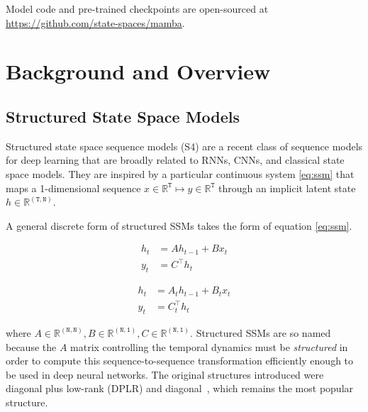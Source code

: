 Model code and pre-trained checkpoints are open-sourced at \url{https://github.com/state-spaces/mamba}.

\section{Background and Overview}
\label{sec:background}

\subsection{Structured State Space Models}

Structured state space sequence models (S4) are a recent class of sequence models for deep learning that are broadly related to RNNs, CNNs, and classical state space models. They are inspired by a particular continuous system \eqref{eq:ssm}
that maps a 1-dimensional sequence $x \in \mathbb{R}^\mathtt{T} \mapsto y \in \mathbb{R}^\mathtt{T}$ through an implicit latent state \( h \in \mathbb{R}^{\mathtt{(T, N)}} \). 

A general discrete form of structured SSMs takes the form of equation \eqref{eq:ssm}.

\begin{center}

\begin{minipage}[t]{.45\linewidth}
\begin{subequations}
  \label{eq:ssm}
  \begin{align}
  \label{eq:ssm:1}
    h_{t} &= A h_{t-1} + B x_t \\
  \label{eq:ssm:2}
    y_t &= C^{\top} h_t
  \end{align}
\end{subequations}
\end{minipage}
\qquad
\begin{minipage}[t]{.45\linewidth}
\begin{subequations}
  \label{eq:s6}
  \begin{align}
  \label{eq:s6:1}
    h_{t} &= A_t h_{t-1} + B_t x_t \\
  \label{eq:s6:2}
    y_t &= C_t^{\top} h_t
  \end{align}
\end{subequations}
\end{minipage}
\end{center}

where $A \in \mathbb{R}^{\mathtt{(N,N)}}, B \in \mathbb{R}^{\mathtt{(N,1)}}, C \in \mathbb{R}^{\mathtt{(N,1)}}$.
Structured SSMs are so named because the $A$ matrix controlling the temporal dynamics must be \emph{structured} in order to compute this sequence-to-sequence transformation efficiently enough to be used in deep neural networks. The original structures introduced were diagonal plus low-rank (DPLR) \citep{gu2022efficiently} and diagonal~\citep{gupta2022diagonal,gu2022parameterization,smith2023s5}, which remains the most popular structure.

